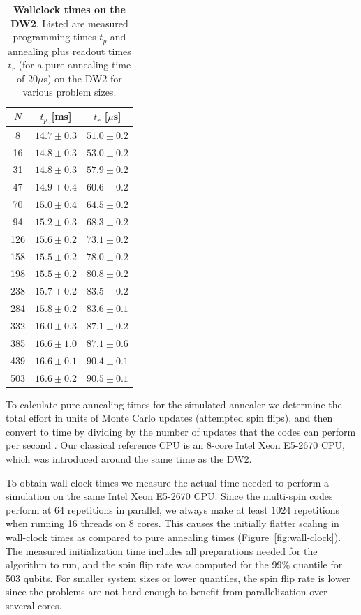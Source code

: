 \begin{table}
\centering
\begin{tabular}{|c|c|c|}
\hline
$N$ & $t_p$ [ms] & $t_r$ [$\mu$s] \\
\hline
8 & $14.7 \pm 0.3$ & $51.0 \pm 0.2$ \\
16 & $14.8 \pm 0.3$ & $53.0 \pm 0.2$ \\
31 & $14.8 \pm 0.3$ & $57.9 \pm 0.2$ \\
47 & $14.9 \pm 0.4$ & $60.6 \pm 0.2$ \\
70 & $15.0 \pm 0.4$ & $64.5 \pm 0.2$ \\
94 & $15.2 \pm 0.3$ & $68.3 \pm 0.2$ \\
126 & $15.6 \pm 0.2$ & $73.1 \pm 0.2$ \\
158 & $15.5 \pm 0.2$ & $78.0 \pm 0.2$ \\
198 & $15.5 \pm 0.2$ & $80.8  \pm 0.2$ \\
238 & $15.7 \pm 0.2$ & $83.5 \pm 0.2$ \\
284 & $15.8 \pm 0.2$ & $83.6 \pm 0.1$ \\
332 & $16.0 \pm 0.3$ & $87.1 \pm 0.2$ \\
385 & $16.6 \pm 1.0$ & $87.1 \pm 0.6$ \\
439 & $16.6 \pm 0.1$ & $90.4 \pm 0.1$ \\
503 & $16.6 \pm 0.2$ & $90.5 \pm 0.1$ \\
\hline
\end{tabular}
\caption{{\bf Wallclock times on the DW2}. Listed are measured programming times $t_p$ and annealing plus readout times $t_r$ (for a pure annealing time of $20\mu$s) on the DW2 for various problem sizes.}
\label{tab:dw2times}
\end{table}





To calculate pure annealing times for the simulated annealer we  determine the total effort in units of Monte Carlo updates (attempted spin flips), and then convert to time by dividing by the number of updates that the codes can perform per second \cite{sapaper}. Our classical reference CPU is an $8$-core Intel Xeon E5-2670 CPU, which was introduced around the same time as the DW2.

To obtain wall-clock times we measure the actual time needed to perform a simulation on the same  Intel Xeon E5-2670 CPU. Since the multi-spin codes perform at $64$ repetitions in parallel, we always make at least $1024$ repetitions when running 16 threads on $8$ cores. This causes the initially flatter scaling in wall-clock times as compared to pure annealing times (Figure~\ref{fig:wall-clock}). The measured initialization time includes all preparations needed for the algorithm to run, and the spin flip rate was computed for the 99\% quantile for 503 qubits. For smaller system sizes or lower quantiles, the spin flip rate is lower since the problems are not hard enough to benefit from parallelization over several cores.\\

